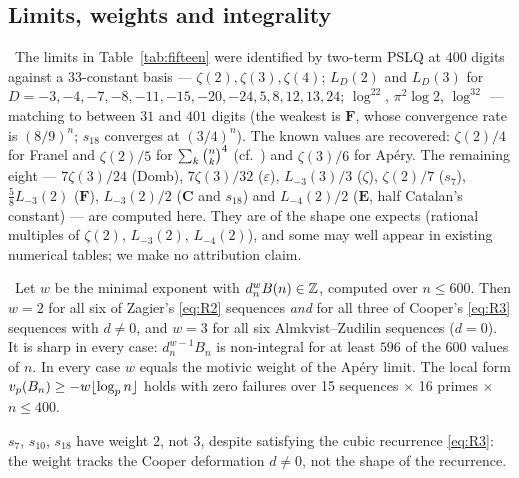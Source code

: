 \subsection{Limits, weights and integrality}

\begin{observation}\label{obs:limits}
\Verified\ The limits in Table~\ref{tab:fifteen} were identified by two-term PSLQ at $400$
digits against a $33$-constant basis --- $\zeta(2),\zeta(3),\zeta(4)$; $L_D(2)$ and
$L_D(3)$ for $D=-3,-4,-7,-8,-11,-15,-20,-24,5,8,12,13,24$; $\log^22$, $\pi^2\log2$,
$\log^32$ --- matching to between $31$ and $401$ digits (the weakest is $\mathbf F$, whose
convergence rate is $(8/9)^n$; $s_{18}$ converges at $(3/4)^n$). The known values are
recovered: $\zeta(2)/4$ for Franel and $\zeta(2)/5$ for $\sum_k\binom{n}{k}^4$
(cf.\ \cite[eq.~(7.2)]{ChamStraub}) and $\zeta(3)/6$ for Ap\'ery. The remaining eight ---
$7\zeta(3)/24$ (Domb), $7\zeta(3)/32$ ($\varepsilon$), $L_{-3}(3)/3$ ($\zeta$),
$\zeta(2)/7$ ($s_7$), $\tfrac58L_{-3}(2)$ ($\mathbf F$), $L_{-3}(2)/2$ ($\mathbf C$ and
$s_{18}$) and $L_{-4}(2)/2$ ($\mathbf E$, half Catalan's constant) --- are computed here.
They are of the shape one expects (rational multiples of $\zeta(2)$, $L_{-3}(2)$,
$L_{-4}(2)$), and some may well appear in existing numerical tables; we make no
attribution claim.
\end{observation}

\begin{observation}[weights]\label{obs:weights}
\Verified\ Let $w$ be the minimal exponent with $d_n^wB(n)\in\mathbb{Z}$, computed over $n\le600$.
Then $w=2$ for all six of Zagier's \eqref{eq:R2} sequences \emph{and} for all three of
Cooper's \eqref{eq:R3} sequences with $d\ne0$, and $w=3$ for all six Almkvist--Zudilin
sequences ($d=0$). It is sharp in every case: $d_n^{w-1}B_n$ is non-integral for at least
$596$ of the $600$ values of $n$. In every case $w$ equals the motivic weight of the
Ap\'ery limit. The local form $v_p(B_n)\ge-w\lfloor\log_pn\rfloor$ holds with zero
failures over 15 sequences $\times$ 16 primes $\times$ $n\le400$.
\end{observation}

\begin{observation}\label{obs:cooper}
$s_7$, $s_{10}$, $s_{18}$ have weight $2$, not $3$, despite satisfying the cubic
recurrence \eqref{eq:R3}: the weight tracks the Cooper deformation $d\ne0$, not the shape
of the recurrence.
\end{observation}

